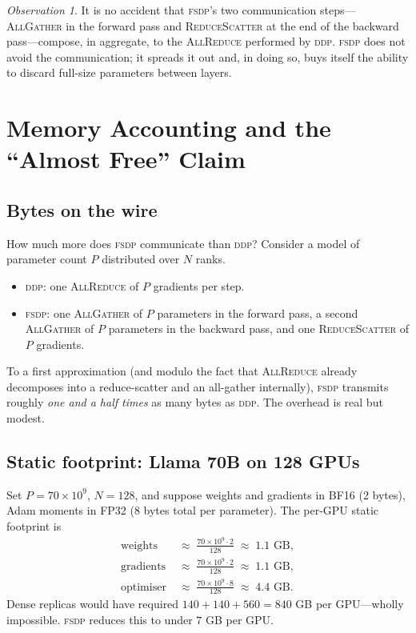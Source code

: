 \documentclass[11pt,a4paper]{article}
\theoremstyle{definition}
\theoremstyle{remark}
\newtheorem*{observation}{Observation}
\newcommand{\FSDP}{\textsc{fsdp}}
\newcommand{\DDP}{\textsc{ddp}}
\newcommand{\AllGather}{\textsc{AllGather}}
\newcommand{\ReduceScatter}{\textsc{ReduceScatter}}
\newcommand{\AllReduce}{\textsc{AllReduce}}
\begin{document}
\begin{observation}
It is no accident that \FSDP{}'s two communication steps---\AllGather{} in the forward pass and \ReduceScatter{} at the end of the backward pass---compose, in aggregate, to the \AllReduce{} performed by \DDP{}. \FSDP{} does not avoid the communication; it spreads it out and, in doing so, buys itself the ability to discard full-size parameters between layers.
\end{observation}

\section{Memory Accounting and the ``Almost Free'' Claim}

\subsection{Bytes on the wire}

How much more does \FSDP{} communicate than \DDP{}? Consider a model of parameter count $P$ distributed over $N$ ranks.

\begin{itemize}[leftmargin=2em]
    \item \DDP{}: one \AllReduce{} of $P$ gradients per step.
    \item \FSDP{}: one \AllGather{} of $P$ parameters in the forward pass, a second \AllGather{} of $P$ parameters in the backward pass, and one \ReduceScatter{} of $P$ gradients.
\end{itemize}

To a first approximation (and modulo the fact that \AllReduce{} already decomposes into a reduce-scatter and an all-gather internally), \FSDP{} transmits roughly \emph{one and a half times} as many bytes as \DDP{}. The overhead is real but modest.

\subsection{Static footprint: Llama 70B on 128 GPUs}

Set $P = 70 \times 10^9$, $N = 128$, and suppose weights and gradients in \textsc{BF16} (2 bytes), Adam moments in \textsc{FP32} (8 bytes total per parameter). The per-GPU static footprint is
\begin{align}
    \text{weights}    &\;\approx\; \frac{70 \times 10^9 \cdot 2}{128} \;\approx\; 1.1 \text{ GB}, \\
    \text{gradients}  &\;\approx\; \frac{70 \times 10^9 \cdot 2}{128} \;\approx\; 1.1 \text{ GB}, \\
    \text{optimiser}  &\;\approx\; \frac{70 \times 10^9 \cdot 8}{128} \;\approx\; 4.4 \text{ GB}.
\end{align}
Dense replicas would have required $140 + 140 + 560 = 840$ GB per GPU---wholly impossible. \FSDP{} reduces this to under $7$ GB per GPU.
\end{document}
